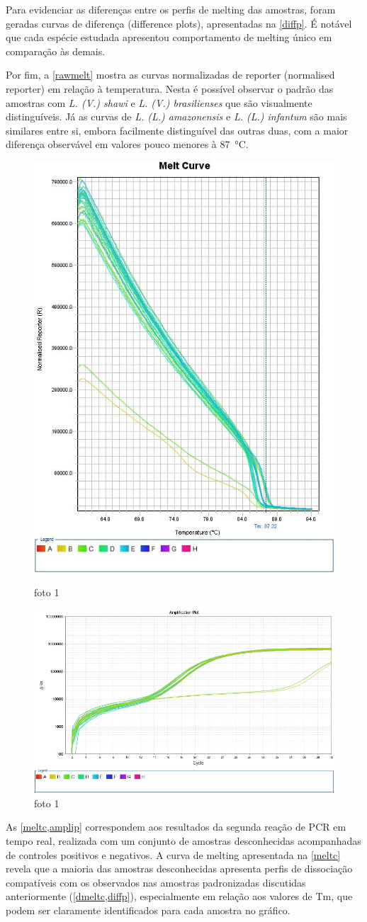 Para evidenciar as diferenças entre os perfis de melting das
amostras, foram geradas curvas de diferença (difference plots), apresentadas na
\cref{diffp}. 
É notável que cada espécie estudada
apresentou comportamento de melting único em comparação às demais. 

Por fim, a \cref{rawmelt} mostra as curvas normalizadas de reporter (normalised
reporter) em relação à
temperatura. Nesta é possível observar o padrão das amostras com \textit{L. (V.) shawi} e
\textit{L. (V.) brasilienses} que são visualmente distinguíveis. Já as curvas de
\textit{L. (L.) amazonensis} e \textit{L. (L.) infantum} são mais similares
entre si, embora facilmente distinguível das outras duas,  com
a maior diferença observável em valores pouco menores à \qty{87}{\celsius}.

\begin{figure}
        \centering
        \includegraphics[width=.4\textwidth]{fig/Melt Curve.jpg}
        \caption{foto 1}
        \label{meltc}
        \includegraphics[width=.4\textwidth]{fig/Amplification Plot.jpg}
        \caption{foto 1}
        \label{amplip}
\end{figure}

As \cref{meltc,amplip} correspondem aos resultados da segunda reação de PCR em
tempo real, realizada com um conjunto de amostras desconhecidas acompanhadas de
controles positivos e negativos. A curva de melting apresentada na \cref{meltc}
revela que a maioria das amostras desconhecidas apresenta perfis de dissociação
compatíveis com os observados nas amostras padronizadas discutidas anteriormente
(\cref{dmeltc,diffp}), especialmente em relação aos valores de Tm, que podem ser
claramente identificados para cada amostra no gráfico.

